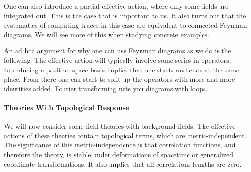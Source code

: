 One can also introduce a partial effective action, where only some fields are integrated out. This is the case that is important to us. It also turns out that the systematics of computing traces in this case are equivalent to connected Feynman diagrams. We will see more of this when studying concrete examples.

An ad hoc argument for why one can use Feynman diagrams as we do is the following: The effective action will typically involve some series in operators. Introducing a position space basis implies that one starts and ends at the same place. From there one can start to split up the operators with more and more identities added. Fourier transforming nets you diagrams with loops.

\paragraph{Theories With Topological Response}
We will now consider some field theories with background fields. The effective actions of these theories contain topological terms, which are metric-independent. The significance of this metric-independence is that correlation functions, and therefore the theory, is stable under deformations of spacetime or generalized coordinate transformations. It also implies that all correlations lengths are zero.

